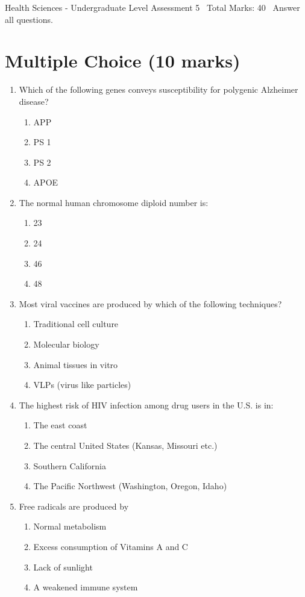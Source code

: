 \documentclass[12pt]{article}
\begin{document}
\begin{center}
Health Sciences - Undergraduate Level Assessment 5 \
Total Marks: 40 \
Answer all questions.
\end{center}

\section*{Multiple Choice (10 marks)}
\begin{enumerate}[label=\arabic*.]
\item Which of the following genes conveys susceptibility for polygenic Alzheimer disease?
\begin{enumerate}[label=(\alph*)]
    \item APP
    \item PS 1
    \item PS 2
    \item APOE
\end{enumerate}
\item The normal human chromosome diploid number is:
\begin{enumerate}[label=(\alph*)]
    \item 23
    \item 24
    \item 46
    \item 48
\end{enumerate}
\item Most viral vaccines are produced by which of the following techniques?
\begin{enumerate}[label=(\alph*)]
    \item Traditional cell culture
    \item Molecular biology
    \item Animal tissues in vitro
    \item VLPs (virus like particles)
\end{enumerate}
\item The highest risk of HIV infection among drug users in the U.S. is in:
\begin{enumerate}[label=(\alph*)]
    \item The east coast
    \item The central United States (Kansas, Missouri etc.)
    \item Southern California
    \item The Pacific Northwest (Washington, Oregon, Idaho)
\end{enumerate}
\item Free radicals are produced by
\begin{enumerate}[label=(\alph*)]
    \item Normal metabolism
    \item Excess consumption of Vitamins A and C
    \item Lack of sunlight
    \item A weakened immune system
\end{enumerate}
\end{enumerate}
\end{document}
